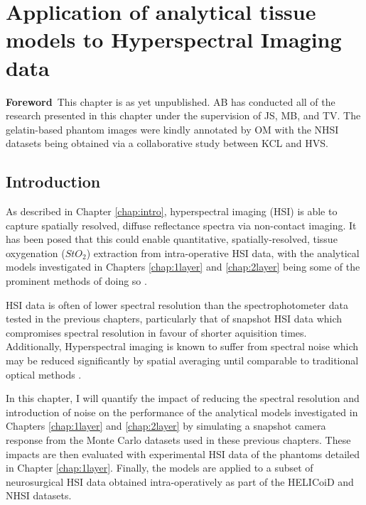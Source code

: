 \chapter[Application of models to HSI data]{Application of analytical tissue models to Hyperspectral Imaging data}\label{chap:HSImodel}
\begin{center}
\begin{minipage}[b]{0.9\linewidth}
\small
\textbf{Foreword\,}
This chapter is as yet unpublished. 
\newline
AB has conducted all of the research presented in this chapter under the supervision of JS, MB, and TV. The gelatin-based phantom images were kindly annotated by OM with the NHSI datasets being obtained via a collaborative study between KCL and HVS. 
\end{minipage}
\end{center}

\section{Introduction}
As described in Chapter \ref{chap:intro}, hyperspectral imaging (HSI) is able to capture spatially resolved, diffuse reflectance spectra via non-contact imaging\cite{Lu2014,Giannoni2018,Calin2014,Shapey2019}. It has been posed that this could enable quantitative, spatially-resolved, tissue oxygenation ($StO_2$) extraction from intra-operative HSI data, with the analytical models investigated in Chapters \ref{chap:1layer} and \ref{chap:2layer} being some of the prominent methods of doing so \cite{Yudovsky2009, Jacques1999, Clancy2015, Clancy2020}. 

HSI data is often of lower spectral resolution than the spectrophotometer data tested in the previous chapters, particularly that of snapshot HSI data which compromises spectral resolution in favour of shorter aquisition times\cite{Geelen2014}. Additionally, Hyperspectral imaging is known to suffer from spectral noise which may be reduced significantly by spatial averaging until comparable to traditional optical methods \cite{Zhang2020}.

In this chapter, I will quantify the impact of reducing the spectral resolution and introduction of noise on the performance of the analytical models investigated in Chapters \ref{chap:1layer} and \ref{chap:2layer} by simulating a snapshot camera response from the Monte Carlo datasets used in these previous chapters. These impacts are then evaluated with experimental HSI data of the phantoms detailed in Chapter \ref{chap:1layer}. Finally, the models are applied to a subset of neurosurgical HSI data obtained intra-operatively as part of the HELICoiD and NHSI datasets. 

